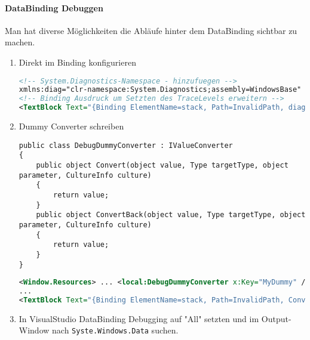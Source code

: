 \paragraph{DataBinding Debuggen} Man hat diverse Möglichkeiten die Abläufe hinter dem DataBinding sichtbar zu machen.
\begin{enumerate}
\item Direkt im Binding konfigurieren
\begin{lstlisting}[language=xml]
<!-- System.Diagnostics-Namespace - hinzufuegen -->
xmlns:diag="clr-namespace:System.Diagnostics;assembly=WindowsBase"
<!-- Binding Ausdruck um Setzten des TraceLevels erweitern -->
<TextBlock Text="{Binding ElementName=stack, Path=InvalidPath, diag:PresentationTraceSources.TraceLevel=High}" />
\end{lstlisting}
\item Dummy Converter schreiben
\begin{lstlisting}
public class DebugDummyConverter : IValueConverter
{
    public object Convert(object value, Type targetType, object parameter, CultureInfo culture)
    {
        return value;
    }
    public object ConvertBack(object value, Type targetType, object parameter, CultureInfo culture)
    {
        return value;
    }
}
\end{lstlisting}
\begin{lstlisting}[language=xml]
<Window.Resources> ... <local:DebugDummyConverter x:Key="MyDummy" /> ... </Window.Resources>
...
<TextBlock Text="{Binding ElementName=stack, Path=InvalidPath, Converter={StaticResource MyDummy}}" />
\end{lstlisting}
\item In VisualStudio DataBinding Debugging auf "{}All"{} setzten und im Output-Window nach \verb+Syste.Windows.Data+ suchen.
\end{enumerate}
